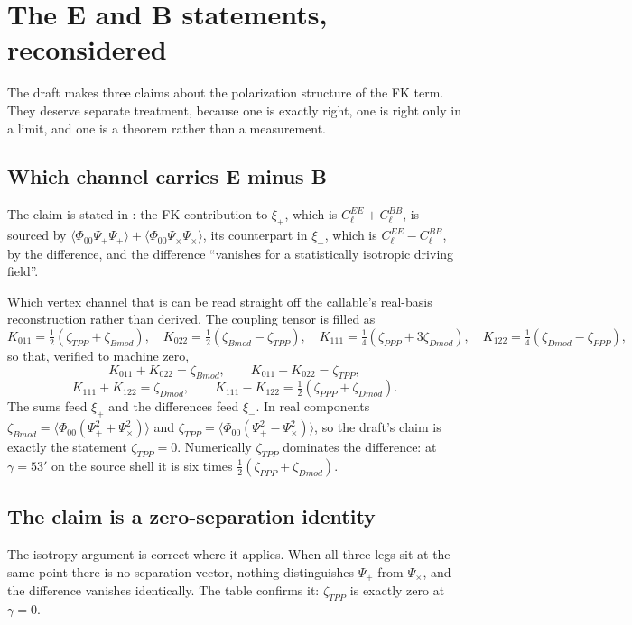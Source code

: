 \section{The E and B statements, reconsidered}
\label{sec:eb}

The draft makes three claims about the polarization structure of the FK
term. They deserve separate treatment, because one is exactly right, one is
right only in a limit, and one is a theorem rather than a measurement.

\subsection{Which channel carries E minus B}

The claim is stated in : the FK contribution to
$\xi_+$, which is $C_\ell^{EE}+C_\ell^{BB}$, is sourced by
$\langle\Phi_{00}\Psi_+\Psi_+\rangle+\langle\Phi_{00}\Psi_\times\Psi_\times\rangle$,
its counterpart in $\xi_-$, which is $C_\ell^{EE}-C_\ell^{BB}$, by the
difference, and the difference ``vanishes for a statistically isotropic
driving field''.

Which vertex channel that is can be read straight off the callable's
real-basis reconstruction rather than derived. The coupling tensor is
filled as
\[
  K_{011}=\tfrac12(\zeta_{TPP}+\zeta_{Bmod}), \quad
  K_{022}=\tfrac12(\zeta_{Bmod}-\zeta_{TPP}), \quad
  K_{111}=\tfrac14(\zeta_{PPP}+3\zeta_{Dmod}), \quad
  K_{122}=\tfrac14(\zeta_{Dmod}-\zeta_{PPP}),
\]
so that, verified to machine zero,
\[
  K_{011}+K_{022}=\zeta_{Bmod}, \qquad K_{011}-K_{022}=\zeta_{TPP},
\]
\[
  K_{111}+K_{122}=\zeta_{Dmod}, \qquad
  K_{111}-K_{122}=\tfrac12(\zeta_{PPP}+\zeta_{Dmod}).
\]
The sums feed $\xi_+$ and the differences feed $\xi_-$. In real components
$\zeta_{Bmod}=\langle\Phi_{00}(\Psi_+^2+\Psi_\times^2)\rangle$ and
$\zeta_{TPP}=\langle\Phi_{00}(\Psi_+^2-\Psi_\times^2)\rangle$, so the
draft's claim is exactly the statement $\zeta_{TPP}=0$. Numerically
$\zeta_{TPP}$ dominates the difference: at $\gamma=53'$ on the source shell
it is six times $\tfrac12(\zeta_{PPP}+\zeta_{Dmod})$.

\subsection{The claim is a zero-separation identity}

The isotropy argument is correct where it applies. When all three legs sit
at the same point there is no separation vector, nothing distinguishes
$\Psi_+$ from $\Psi_\times$, and the difference vanishes identically. The
table confirms it: $\zeta_{TPP}$ is exactly zero at $\gamma=0$.

